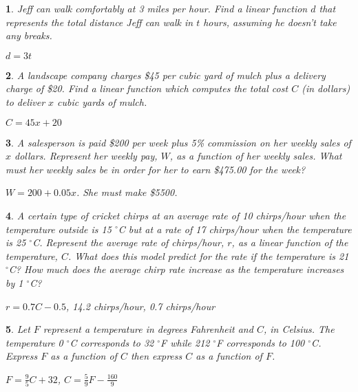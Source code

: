 \documentclass{amsbook}
\newtheorem{exc}{}
\newenvironment{ex}{\begin{exc}\normalfont}{\end{exc}}
\numberwithin{section}{chapter}
\numberwithin{equation}{chapter}
\begin{document}
\begin{ex}
	Jeff can walk comfortably at 3 miles per hour. Find a linear function $d$ that represents the total distance Jeff can walk in $t$ hours, assuming he doesn't take any breaks.
	\begin{sol}
		$d=3t$
	\end{sol}
\end{ex}

\begin{ex}
	A landscape company charges \$45 per cubic yard of mulch plus a delivery charge of \$20. Find a linear function which computes the total cost $C$ (in dollars) to deliver $x$ cubic yards of mulch.
	\begin{sol}
		$C=45x+20$
		\end{sol}
\end{ex}

\begin{ex}
	A salesperson is paid \$200 per week plus 5\% commission on her weekly sales of $x$ dollars. Represent her weekly pay, $W$, as a function of her weekly sales. What must her weekly sales be in order for her to earn \$475.00 for the week?
	\begin{sol}
		$W = 200+0.05x$. She must make \$5500.
	\end{sol}
\end{ex}

\begin{ex}\label{chirps}
	A certain type of cricket chirps at an average rate of 10 chirps/hour when the temperature outside is 15 $^\circ$C but at a rate of 17 chirps/hour when the temperature is 25 $^\circ$C. Represent the average rate of chirps/hour, $r$, as a linear function of the temperature, $C$. What does this model predict for the rate if the temperature is 21 $^\circ$C? How much does the average chirp rate increase as the temperature increases by 1 $^\circ$C?
	\begin{sol}
		$r = 0.7C-0.5$, 14.2 chirps/hour, 0.7 chirps/hour
	\end{sol}
\end{ex}

\begin{ex} \label{FCtemp}
	Let $F$ represent a temperature in degrees Fahrenheit and $C$, in Celsius. The temperature 0 $^\circ$C corresponds to 32 $^\circ$F while 212 $^\circ$F corresponds to 100 $^\circ$C. Express $F$ as a function of $C$ then express $C$ as a function of $F$.
	\begin{sol}
		$F = \frac{9}{5}C+32$, $C = \frac{5}{9}F-\frac{160}{9}$
	\end{sol}
\end{ex}
\end{document}

